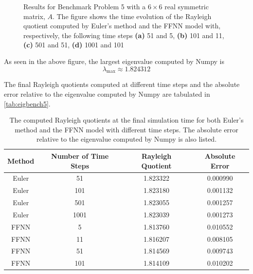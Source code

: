 \begin{figure}[H]
\qquad
{}
\caption{Results for Benchmark Problem 5 with a $6\times 6$ real symmetric matrix, $A$. The figure shows the time evolution of the Rayleigh quotient computed by Euler's method and the FFNN model with, respectively, the following time steps \textbf{(a)} 51 and 5, \textbf{(b)} 101 and 11, \textbf{(c)} 501 and 51, \textbf{(d)} 1001 and 101}
\label{fig:benchrun5}
\end{figure}

As seen in the above figure, the largest eigenvalue computed by Numpy is
\begin{equation*}
    \lambda_\mathrm{max} \approx 1.824312
\end{equation*}

The final Rayleigh quotients computed at different time steps and the absolute error relative to the eigenvalue computed by Numpy are tabulated in \autoref{tab:eigbench5}.

\begin{table}[H]
\caption{The computed Rayleigh quotients at the final simulation time for both Euler's method and the FFNN model with different time steps. The absolute error relative to the eigenvalue computed by Numpy is also listed.}
\centering
{}
\begin{tabular}{c|c|c|c}
\hline
\hline 
Method & Number of Time Steps & Rayleigh Quotient & Absolute Error
\\
\hline 
\hline 
Euler & 51 & 1.823322 & 0.000990
\\
Euler & 101 & 1.823180 & 0.001132
\\
Euler & 501 & 1.823055 & 0.001257
\\
Euler & 1001 & 1.823039 & 0.001273
\\
FFNN & 5 & 1.813760 & 0.010552
\\
FFNN & 11 & 1.816207 & 0.008105
\\
FFNN & 51 & 1.814569 & 0.009743
\\
FFNN & 101 & 1.814109 & 0.010202
\\
\hline
\hline 
\end{tabular}
\label{tab:eigbench5}
\end{table}

